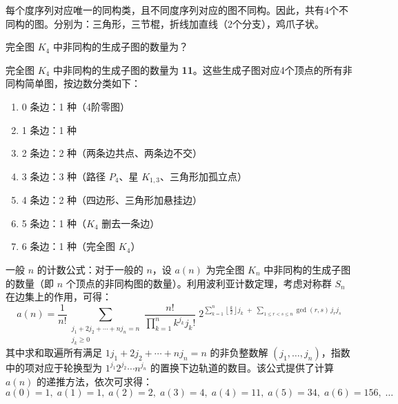 每个度序列对应唯一的同构类，且不同度序列对应的图不同构。因此，共有4个不同构的图。分别为：三角形，三节棍，折线加直线（2个分支），鸡爪子状。

\begin{example}{}{}
    完全图 $K_4$ 中非同构的生成子图的数量为？
\end{example}
完全图 $K_4$ 中非同构的生成子图的数量为 \textbf{11}。这些生成子图对应4个顶点的所有非同构简单图，按边数分类如下：
\begin{enumerate}
    \item 0 条边：1 种（4阶零图）
    \item 1 条边：1 种
    \item 2 条边：2 种（两条边共点、两条边不交）
    \item 3 条边：3 种（路径 $P_4$、星 $K_{1,3}$、三角形加孤立点）
    \item 4 条边：2 种（四边形、三角形加悬挂边）
    \item 5 条边：1 种（$K_4$ 删去一条边）
    \item 6 条边：1 种（完全图 $K_4$）
\end{enumerate}
一般 $n$ 的计数公式：对于一般的 $n$，设 $a(n)$ 为完全图 $K_n$ 中非同构的生成子图的数量（即 $n$ 个顶点的非同构图的数量）。利用波利亚计数定理，考虑对称群 $S_n$ 在边集上的作用，可得：
\[
a(n) = \frac{1}{n!} \sum_{\substack{j_1 + 2j_2 + \cdots + n j_n = n \\ j_k \ge 0}} 
\frac{n!}{\prod_{k=1}^n k^{j_k} j_k!} \; 
2^{\sum_{k=1}^n \left\lfloor \frac{k}{2} \right\rfloor j_k \;+\; 
\sum_{1 \le r < s \le n} \gcd(r, s) \, j_r j_s}
\]
其中求和取遍所有满足 $1j_1 + 2j_2 + \cdots + n j_n = n$ 的非负整数解 $(j_1, \ldots, j_n)$，指数中的项对应于轮换型为 $1^{j_1}2^{j_2}\cdots n^{j_n}$ 的置换下边轨道的数目。该公式提供了计算 $a(n)$ 的递推方法，依次可求得：
\[
a(0)=1,\; a(1)=1,\; a(2)=2,\; a(3)=4,\; a(4)=11,\; a(5)=34,\; a(6)=156,\; \ldots
\]


